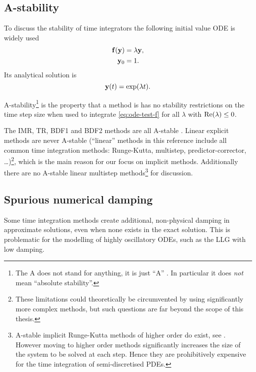 \subsection{A-stability}
\label{sec:A-stability}

To discuss the stability of time integrators the following initial value ODE is widely used
\begin{equation}
  \begin{aligned}
    {\mathbf{f}{\left( \mathbf{y}\right)}} &= \lambda \mathbf{y}, \\
    \mathbf{y}_0 &= 1.
    \label{eq:ode-test-f}
  \end{aligned} 
\end{equation}
Its analytical solution is
\begin{equation}
  \mathbf{y}(t) = \exp(\lambda t).
\end{equation}

A-stability\footnote{The A does not stand for anything, it is just ``A'' \cite[40]{HairerWanner}. In particular it does \emph{not} mean ``absolute stability''.} is the property that a method is has no stability restrictions on the time step size when used to integrate \cref{eq:ode-test-f} for all $\lambda$ with $\operatorname{Re}(\lambda) \leq 0$.

The IMR, TR, BDF1 and BDF2 methods are all A-stable \cite[pgs. 43, 251]{HairerWanner}.
Linear explicit methods are never A-stable \cite{Nevanlinna1974} (``linear'' methods in this reference include all common time integration methods: Runge-Kutta, multistep, predictor-corrector, \ldots)\footnote{These limitations could theoretically be circumvented by using significantly more complex methods, but such questions are far beyond the scope of this thesis.}, which is the main reason for our focus on implicit methods.
Additionally there are no A-stable linear multistep methods\footnote{A-stable implicit Runge-Kutta methods of higher order do exist, see \eg \cite[73]{HairerWanner}.
However moving to higher order methods significantly increases the size of the system to be solved at each step. Hence they are prohibitively expensive for the time integration of semi-discretised PDEs.} for discussion.

\subsection{Spurious numerical damping}
\label{sec:numerical-damping}

Some time integration methods create additional, non-physical damping in approximate solutions, even when none exists in the exact solution.
This is problematic for the modelling of highly oscillatory ODEs, such as the LLG with low damping.

